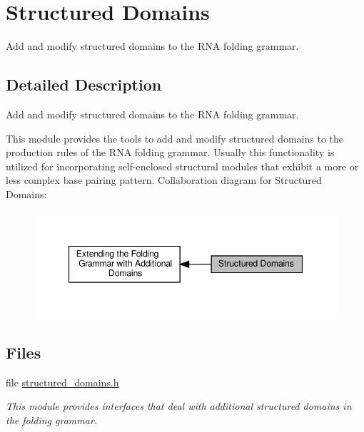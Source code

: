 \hypertarget{group__domains__struc}{}\section{Structured Domains}
\label{group__domains__struc}


Add and modify structured domains to the R\+NA folding grammar.  




\subsection{Detailed Description}
Add and modify structured domains to the R\+NA folding grammar. 

This module provides the tools to add and modify structured domains to the production rules of the R\+NA folding grammar. Usually this functionality is utilized for incorporating self-\/enclosed structural modules that exhibit a more or less complex base pairing pattern. Collaboration diagram for Structured Domains\+:
\nopagebreak
\begin{figure}[H]
\begin{center}
\leavevmode
\includegraphics[width=347pt]{group__domains__struc}
\end{center}
\end{figure}
\subsection*{Files}
\begin{DoxyCompactItemize}
\item 
file \hyperlink{structured__domains_8h}{structured\+\_\+domains.\+h}
\begin{DoxyCompactList}\small\item\em This module provides interfaces that deal with additional structured domains in the folding grammar. \end{DoxyCompactList}\end{DoxyCompactItemize}
